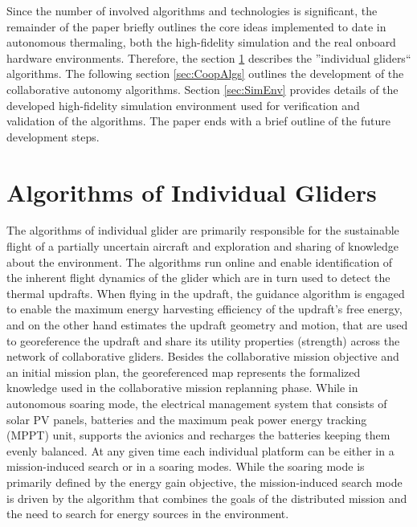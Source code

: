 \documentclass{ifacconf}
\newcommand{\squeezeup}{\vspace{-2.0mm}}
\begin{document}
Since the number of involved algorithms and technologies is significant, the
remainder of the paper briefly outlines the core ideas implemented to date in
autonomous thermaling, both the high-fidelity simulation and the real onboard
hardware environments. Therefore, the section \ref{sec:IndAlgs} describes the
''individual gliders`` algorithms. The following section \ref{sec:CoopAlgs}
outlines the development of the collaborative autonomy algorithms. Section
\ref{sec:SimEnv} provides details of the developed high-fidelity simulation
environment used for verification and validation of the algorithms. The paper
ends with a brief outline of the future development steps.

\section{ Algorithms of Individual Gliders}
\label{sec:IndAlgs}
\squeezeup

The algorithms of individual glider are primarily responsible for the
sustainable flight of a partially uncertain aircraft and exploration and
sharing of knowledge about the environment. The algorithms run online and
enable identification of the inherent flight dynamics of the glider which are
in turn used to detect the thermal updrafts. When flying in the updraft, the
guidance algorithm is engaged to enable the maximum energy harvesting
efficiency of the updraft's free energy, and on the other hand estimates the
updraft geometry and motion, that are used to georeference the updraft and
share its utility properties (strength) across the network of collaborative
gliders. Besides the collaborative mission objective and an initial mission
plan, the georeferenced map represents the formalized knowledge used in the
collaborative mission replanning phase. While in autonomous soaring mode, the
electrical management system that consists of solar PV panels, batteries and
the maximum peak power energy tracking (MPPT) unit, supports the avionics and
recharges the batteries keeping them evenly balanced. At any given time each
individual platform can be either in a mission-induced search or in a soaring
modes. While the soaring mode is primarily defined by the energy gain
objective, the mission-induced search mode is driven by the algorithm that
combines the goals of the distributed mission and the need to search for
energy sources in the environment.
%
\end{document}
